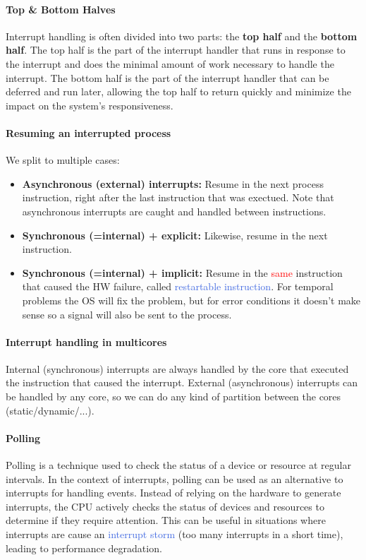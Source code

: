 \documentclass[openany,12pt]{book}
\newcommand{\red}[1]{\textcolor{Red}{#1}}
\newcommand{\blue}[1]{\textcolor{RoyalBlue}{#1}}
\begin{document}
\paragraph{Top \& Bottom Halves} Interrupt handling is often divided into two parts: the \textbf{top half} and the \textbf{bottom half}. The top half is the part of the interrupt handler that runs in response to the interrupt and does the minimal amount of work necessary to handle the interrupt. The bottom half is the part of the interrupt handler that can be deferred and run later, allowing the top half to return quickly and minimize the impact on the system's responsiveness.


\paragraph{Resuming an interrupted process} We split to multiple cases:
\begin{itemize}
  \item \textbf{Asynchronous (external) interrupts:} Resume in the next process instruction, right after the last instruction that was exectued. Note that asynchronous interrupts are caught and handled between instructions.

  \item \textbf{Synchronous (=internal) + explicit:} Likewise, resume in the next instruction.

  \item \textbf{Synchronous (=internal) + implicit:} Resume in the \red{same} instruction that caused the HW failure, called \blue{restartable instruction}. For temporal problems the OS will fix the problem, but for error conditions it doesn't make sense so a signal will also be sent to the process.
\end{itemize}


\paragraph{Interrupt handling in multicores} Internal (synchronous) interrupts are always handled by the core that executed the instruction that caused the interrupt. External (asynchronous) interrupts can be handled by any core, so we can do any kind of partition between the cores (static/dynamic/...).


\paragraph{Polling} Polling is a technique used to check the status of a device or resource at regular intervals. In the context of interrupts, polling can be used as an alternative to interrupts for handling events. Instead of relying on the hardware to generate interrupts, the CPU actively checks the status of devices and resources to determine if they require attention. This can be useful in situations where interrupts are cause an \blue{interrupt storm} (too many interrupts in a short time), leading to performance degradation. 
\end{document}
